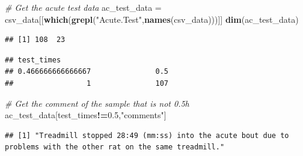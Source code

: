 \documentclass[]{article}
\newenvironment{Shaded}{\begin{snugshade}}{\end{snugshade}}
\newcommand{\KeywordTok}[1]{\textcolor[rgb]{0.13,0.29,0.53}{\textbf{#1}}}
\newcommand{\FloatTok}[1]{\textcolor[rgb]{0.00,0.00,0.81}{#1}}
\newcommand{\StringTok}[1]{\textcolor[rgb]{0.31,0.60,0.02}{#1}}
\newcommand{\CommentTok}[1]{\textcolor[rgb]{0.56,0.35,0.01}{\textit{#1}}}
\newcommand{\OperatorTok}[1]{\textcolor[rgb]{0.81,0.36,0.00}{\textbf{#1}}}
\newcommand{\NormalTok}[1]{#1}
\begin{document}
\begin{Shaded}
\begin{Highlighting}[]
\CommentTok{# Get the acute test data}
\NormalTok{ac_test_data =}\StringTok{ }\NormalTok{csv_data[[}\KeywordTok{which}\NormalTok{(}\KeywordTok{grepl}\NormalTok{(}\StringTok{"Acute.Test"}\NormalTok{,}\KeywordTok{names}\NormalTok{(csv_data)))]]}
\KeywordTok{dim}\NormalTok{(ac_test_data)}
\end{Highlighting}
\end{Shaded}

\begin{verbatim}
## [1] 108  23
\end{verbatim}

\begin{Shaded}
\end{Shaded}

\begin{verbatim}
## test_times
## 0.466666666666667               0.5 
##                 1               107
\end{verbatim}

\begin{Shaded}
\begin{Highlighting}[]
\CommentTok{# Get the comment of the sample that is not 0.5h}
\NormalTok{ac_test_data[test_times}\OperatorTok{!=}\FloatTok{0.5}\NormalTok{,}\StringTok{"comments"}\NormalTok{]}
\end{Highlighting}
\end{Shaded}

\begin{verbatim}
## [1] "Treadmill stopped 28:49 (mm:ss) into the acute bout due to problems with the other rat on the same treadmill."
\end{verbatim}

\begin{Shaded}
\end{Shaded}
\end{document}
